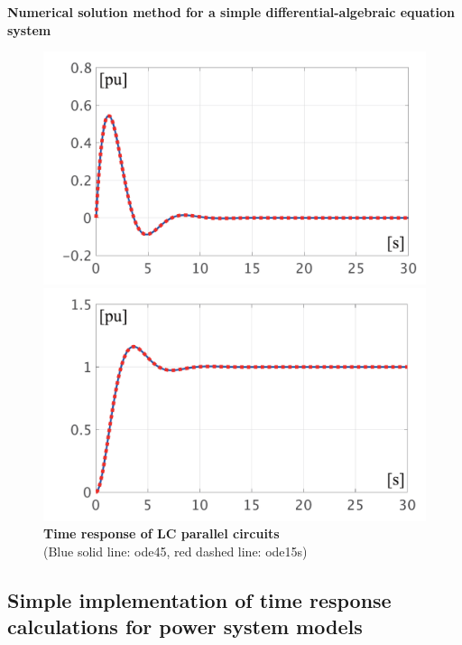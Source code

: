 \documentclass[graybox, envcountchap]{svmult}
\begin{document}
\begin{example}{\textbf{Numerical solution method for a simple differential-algebraic
equation system}}
\begin{figure}[t]
  \centering
  {
    \begin{minipage}{0.49\linewidth}
      \centering
      \includegraphics[width = 1.0\linewidth]{figs/iL}
    \end{minipage}
    \begin{minipage}{0.49\linewidth}
      \centering
      \includegraphics[width = 1.0\linewidth]{figs/vC}
    \end{minipage}
    \medskip
    \caption{\textbf{Time response of LC parallel circuits}
      \\ \centering(Blue solid line: ode45, red dashed line: ode15s)}
    \label{fig:solution_dae}
  }
  \medskip
\end{figure}
\end{example}

\subsection{Simple implementation of time response calculations for power system
models}
\end{document}
